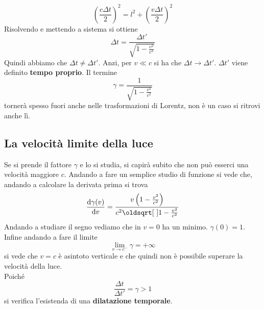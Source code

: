 \begin{equation*}
  {\left( \frac{c\Delta t}{2} \right)}^2=l^2+{\left( \frac{v\Delta t}{2} \right)}^2
\end{equation*}
Risolvendo e mettendo a sistema si ottiene
\begin{equation*}
  \Delta t = \frac{\Delta t'}{\sqrt{1-\frac{v^2}{c^2}}}
\end{equation*}
Quindi abbiamo che $\Delta t\neq\Delta t'$. Anzi, per $v\ll c$ si ha che $\Delta t \to \Delta t'$.
$\Delta t'$ viene definito \textbf{tempo proprio}. Il termine
\begin{equation*}
  \gamma = \frac{1}{\sqrt{1-\frac{v^2}{c^2}}}
\end{equation*}
tornerà spesso fuori anche nelle trasformazioni di Lorentz, non è un caso si ritrovi anche lì.

\subsection{La velocità limite della luce}
Se si prende il fattore $\gamma$ e lo si studia, si capirà subito che non può esserci una velocità
maggiore $c$. Andando a fare un semplice studio di funzione si vede che, andando a calcolare la 
derivata prima si trova
\begin{equation*}
  \der{\gamma(v)}{v} = \frac{v \left( 1-\frac{v^2}{c^2} \right)}{c^2\sqrt{1-\frac{v^2}{c^2}}}
\end{equation*}
Andando a studiare il segno vediamo che in $v=0$ ha un minimo. $\gamma(0)=1$.
Infine andando a fare il limite
\begin{equation*}
  \lim\limits_{v\to c^-} \gamma = +\infty 
\end{equation*}
si vede che $v=c$ è asintoto verticale e che quindi non è possibile superare la velocità della 
luce.\\
Poiché
\begin{equation*}
  \frac{\Delta t}{\Delta t'}=\gamma > 1
\end{equation*}
si verifica l'esistenda di una \textbf{dilatazione temporale}.

